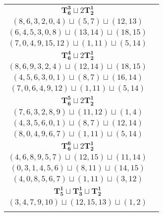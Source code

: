 \documentclass{article}
\begin{document}
\begin{longtable}{|c|c|}
        \hline
        $\mathbf{T_{6}^{3}} \sqcup 2\mathbf{T_{2}^{1}}$ & \begin{tabular}{c}
        $(0,1,2,4,7,5)\sqcup(9,6)\sqcup(8,10)$ \\ 
        $(8,6,3,2,0,4)\sqcup(5,7)\sqcup(12,13)$ \\ 
        $(6,4,5,3,0,8)\sqcup(13,14)\sqcup(18,15)$ \\ 
        $(7,0,4,9,15,12)\sqcup(1,11)\sqcup(5,14)$
        \end{tabular} \\ 
        \hline
        $\mathbf{T_{6}^{4}} \sqcup 2\mathbf{T_{2}^{1}}$ & \begin{tabular}{c}
        $(1,2,5,4,6,7)\sqcup(13,14)\sqcup(12,15)$ \\ 
        $(8,6,9,3,2,4)\sqcup(12,14)\sqcup(18,15)$ \\ 
        $(4,5,6,3,0,1)\sqcup(8,7)\sqcup(16,14)$ \\ 
        $(7,0,6,4,9,12)\sqcup(1,11)\sqcup(5,14)$
        \end{tabular} \\ 
        \hline
        $\mathbf{T_{6}^{5}} \sqcup 2\mathbf{T_{2}^{1}}$ & \begin{tabular}{c}
        $(0,2,4,7,1,5)\sqcup(11,13)\sqcup(12,15)$ \\ 
        $(7,6,3,2,8,9)\sqcup(11,12)\sqcup(1,4)$ \\ 
        $(4,3,5,6,0,1)\sqcup(8,7)\sqcup(12,14)$ \\ 
        $(8,0,4,9,6,7)\sqcup(1,11)\sqcup(5,14)$
        \end{tabular} \\ 
        \hline
        $\mathbf{T_{6}^{6}} \sqcup 2\mathbf{T_{2}^{1}}$ & \begin{tabular}{c}
        $(0,2,1,3,4,5)\sqcup(12,14)\sqcup(18,19)$ \\ 
        $(4,6,8,9,5,7)\sqcup(12,15)\sqcup(11,14)$ \\ 
        $(0,3,1,4,5,6)\sqcup(8,11)\sqcup(14,15)$ \\ 
        $(4,0,8,5,6,7)\sqcup(1,11)\sqcup(3,12)$
        \end{tabular} \\ 
        \hline
        $\mathbf{T_{5}^{1}} \sqcup \mathbf{T_{3}^{1}} \sqcup \mathbf{T_{2}^{1}}$ & \begin{tabular}{c}
        $(2,4,6,9,12)\sqcup(13,14,15)\sqcup(18,19)$ \\ 
        $(3,4,7,9,10)\sqcup(12,15,13)\sqcup(1,2)$ \\ 

\end{tabular}
\end{longtable}
\end{document}
